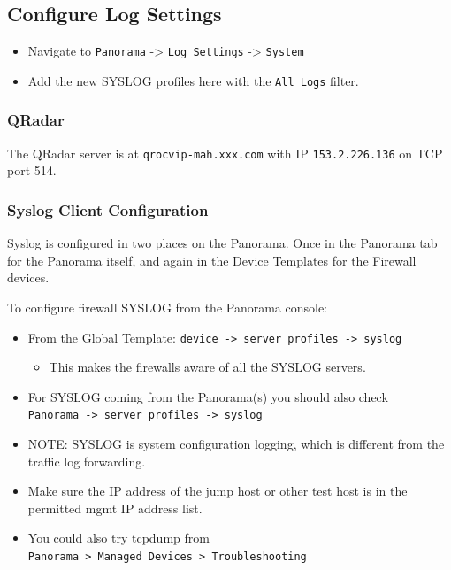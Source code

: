 \documentclass[
  english,
  twoside]{article}
\providecommand{\tightlist}{%
  \setlength{\itemsep}{0pt}\setlength{\parskip}{0pt}}
\begin{document}
\hypertarget{configure-log-settings}{%
\subsection{Configure Log Settings}\label{configure-log-settings}}

\begin{itemize}
\tightlist
\item
  Navigate to \texttt{Panorama} -\textgreater{} \texttt{Log\ Settings}
  -\textgreater{} \texttt{System}
\item
  Add the new SYSLOG profiles here with the \texttt{All\ Logs} filter.
\end{itemize}

\hypertarget{qradar}{%
\subsubsection{QRadar}\label{qradar}}

The QRadar server is at \texttt{qrocvip-mah.xxx.com} with IP
\texttt{153.2.226.136} on TCP port 514.

\hypertarget{syslog-client-configuration}{%
\subsubsection{Syslog Client
Configuration}\label{syslog-client-configuration}}

Syslog is configured in two places on the Panorama. Once in the Panorama
tab for the Panorama itself, and again in the Device Templates for the
Firewall devices.

To configure firewall SYSLOG from the Panorama console:

\begin{itemize}
\tightlist
\item
  From the Global Template:
  \texttt{device\ -\textgreater{}\ server\ profiles\ -\textgreater{}\ syslog}

  \begin{itemize}
  \tightlist
  \item
    This makes the firewalls aware of all the SYSLOG servers.
  \end{itemize}
\item
  For SYSLOG coming from the Panorama(s) you should also check
  \texttt{Panorama\ -\textgreater{}\ server\ profiles\ -\textgreater{}\ syslog}
\item
  NOTE: SYSLOG is system configuration logging, which is different from
  the traffic log forwarding.
\item
  Make sure the IP address of the jump host or other test host is in the
  permitted mgmt IP address list.
\item
  You could also try tcpdump from
  \texttt{Panorama\ \textgreater{}\ Managed\ Devices\ \textgreater{}\ Troubleshooting}
\end{itemize}
\end{document}

